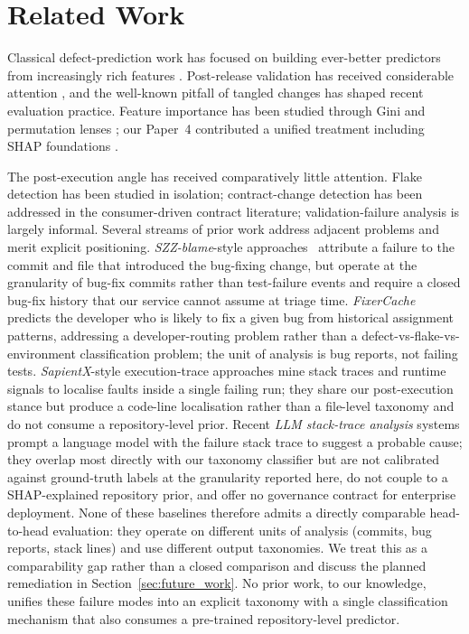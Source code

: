 \documentclass[conference]{IEEEtran}
\begin{document}
\section{Related Work}
\label{sec:related}

Classical defect-prediction work has focused on building ever-better predictors from increasingly rich features \cite{Moser2008,Nagappan2010,DAmbros2012,Elish2008,Shatnawi2010,Zimmermann2007,Menzies2007}. Post-release validation has received considerable attention \cite{Tantithamthavorn2017,Turhan2009}, and the well-known pitfall of tangled changes \cite{Herzig2015} has shaped recent evaluation practice. Feature importance has been studied through Gini and permutation lenses \cite{Breiman2001,Fisher2019}; our Paper~4 contributed a unified treatment including SHAP foundations \cite{Shapley1953,Lundberg2017}.

The post-execution angle has received comparatively little attention. Flake detection has been studied in isolation; contract-change detection has been addressed in the consumer-driven contract literature; validation-failure analysis is largely informal. Several streams of prior work address adjacent problems and merit explicit positioning. \emph{SZZ-blame}-style approaches~\cite{Sliwerski2005,Kim2006SZZ} attribute a failure to the commit and file that introduced the bug-fixing change, but operate at the granularity of bug-fix commits rather than test-failure events and require a closed bug-fix history that our service cannot assume at triage time. \emph{FixerCache}~\cite{Wang2014FixerCache} predicts the developer who is likely to fix a given bug from historical assignment patterns, addressing a developer-routing problem rather than a defect-vs-flake-vs-environment classification problem; the unit of analysis is bug reports, not failing tests. \emph{SapientX}-style execution-trace approaches mine stack traces and runtime signals to localise faults inside a single failing run; they share our post-execution stance but produce a code-line localisation rather than a file-level taxonomy and do not consume a repository-level prior. Recent \emph{LLM stack-trace analysis} systems prompt a language model with the failure stack trace to suggest a probable cause; they overlap most directly with our taxonomy classifier but are not calibrated against ground-truth labels at the granularity reported here, do not couple to a SHAP-explained repository prior, and offer no governance contract for enterprise deployment. None of these baselines therefore admits a directly comparable head-to-head evaluation: they operate on different units of analysis (commits, bug reports, stack lines) and use different output taxonomies. We treat this as a comparability gap rather than a closed comparison and discuss the planned remediation in Section~\ref{sec:future_work}. No prior work, to our knowledge, unifies these failure modes into an explicit taxonomy with a single classification mechanism that also consumes a pre-trained repository-level predictor.
\end{document}
